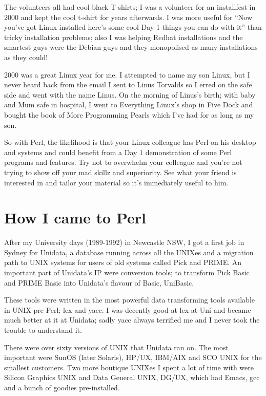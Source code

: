 \documentclass{article}
\begin{document}
The volunteers all had cool black T-shirts; I was a volunteer for an
installfest in 2000 and kept the cool t-shirt for years afterwards.
I was more useful for ``Now you've got Linux installed here's some
cool Day 1 things you can do with it'' than tricky installation
problems; also I was helping Redhat installations and the smartest
guys were the Debian guys and they monopolised as many installations
as they could!

2000 was a great Linux year for me. I attempted to name my son Linux,
but I never heard back from the email I sent to Linus Torvalds so I
erred on the safe side and went with the name Linus. On the morning of
Linus's birth; with baby and Mum safe in hospital, I went to
Everything Linux's shop in Five Dock and bought the book of
More Programming Pearls which I've had for as long as my son.

So with Perl, the likelihood is that your Linux colleague has Perl on
his desktop and systems and could benefit from a Day 1 demonstration
of some Perl programs and features. Try not to overwhelm your
colleague and you're not trying to show off your mad skillz and
superiority. See what your friend is interested in and tailor your
material so it's immediately useful to him.

\section{How I came to Perl}

After my University days (1989-1992) in Newcastle NSW, I got a first
job in Sydney for Unidata, a database running across all the UNIXes
and a migration path to UNIX systems for users of old systems called
Pick and PRIME. An important part of Unidata's IP were conversion
tools; to transform Pick Basic and PRIME Basic into Unidata's flavour
of Basic, UniBasic.

These tools were written in the most powerful data transforming tools
available in UNIX pre-Perl; lex and yacc. I was decently good at lex
at Uni and became much better at it at Unidata; sadly yacc always
terrified me and I never took the trouble to understand it.

There were over sixty versions of UNIX that Unidata ran on. The most
important were SunOS (later Solaris), HP/UX, IBM/AIX and SCO UNIX for
the smallest customers. Two more boutique UNIXes I spent a lot of time
with were Silicon Graphics UNIX and Data General UNIX, DG/UX, which
had Emacs, gcc and a bunch of goodies pre-installed.
\end{document}
